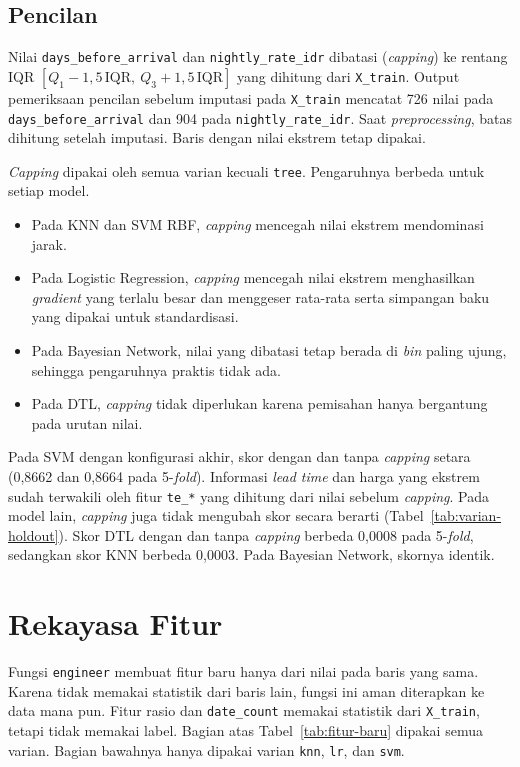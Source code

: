 \subsection{Pencilan}

Nilai \texttt{days\_before\_arrival} dan \texttt{nightly\_rate\_idr} dibatasi
(\textit{capping}) ke rentang IQR
$[Q_1-1{,}5\,\text{IQR},\ Q_3+1{,}5\,\text{IQR}]$ yang dihitung dari
\texttt{X\_train}. Output pemeriksaan pencilan sebelum imputasi pada \texttt{X\_train}
mencatat 726 nilai pada \texttt{days\_before\_arrival} dan 904 pada
\texttt{nightly\_rate\_idr}. Saat \textit{preprocessing}, batas dihitung
setelah imputasi. Baris dengan nilai ekstrem tetap dipakai.

\textit{Capping} dipakai oleh semua varian kecuali \texttt{tree}. Pengaruhnya
berbeda untuk setiap model.
\begin{itemize}
	\item Pada KNN dan SVM RBF, \textit{capping} mencegah nilai ekstrem
	mendominasi jarak.
	\item Pada Logistic Regression, \textit{capping} mencegah nilai ekstrem
	menghasilkan \textit{gradient} yang terlalu besar dan menggeser rata-rata
	serta simpangan baku yang dipakai untuk standardisasi.
	\item Pada Bayesian Network, nilai yang dibatasi tetap berada di \textit{bin}
	paling ujung, sehingga pengaruhnya praktis tidak ada.
	\item Pada DTL, \textit{capping} tidak diperlukan karena pemisahan hanya
	bergantung pada urutan nilai.
\end{itemize}
Pada SVM dengan konfigurasi akhir, skor dengan dan tanpa \textit{capping} setara
(0,8662 dan 0,8664 pada 5-\textit{fold}). Informasi \textit{lead time} dan harga
yang ekstrem sudah terwakili oleh fitur \texttt{te\_*} yang dihitung dari nilai
sebelum \textit{capping}. Pada model lain, \textit{capping} juga tidak mengubah
skor secara berarti (Tabel~\ref{tab:varian-holdout}). Skor DTL dengan dan tanpa
\textit{capping} berbeda 0,0008 pada 5-\textit{fold}, sedangkan skor KNN berbeda
0,0003. Pada Bayesian Network, skornya identik.

\section{Rekayasa Fitur}

Fungsi \texttt{engineer} membuat fitur baru hanya dari nilai pada baris yang sama.
Karena tidak memakai statistik dari baris lain, fungsi ini aman diterapkan ke data
mana pun. Fitur rasio dan \texttt{date\_count} memakai statistik dari
\texttt{X\_train}, tetapi tidak memakai label. Bagian atas
Tabel~\ref{tab:fitur-baru} dipakai semua varian. Bagian bawahnya hanya dipakai
varian \texttt{knn}, \texttt{lr}, dan \texttt{svm}.

